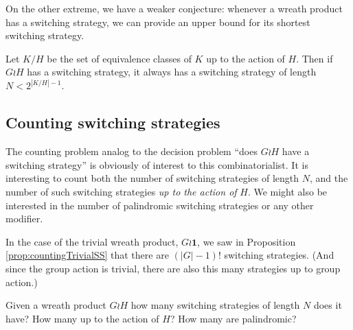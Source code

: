 On the other extreme, we have a weaker conjecture: whenever a wreath product has
a switching strategy, we can provide an upper bound for its shortest switching
strategy.

\begin{conjecture}
  Let $K/H$ be the set of equivalence classes of $K$ up to the action of $H$.
  Then if $G \wr H$ has a switching strategy, it always has a switching strategy
  of length $N < 2^{|K/H|-1}$.
\end{conjecture}

\subsection{Counting switching strategies}
The counting problem analog to the decision problem
``does $G \wr H$ have a switching strategy'' is obviously of interest to this
combinatorialist. It is interesting to count both the number of switching
strategies of length $N$, and the number of such switching strategies
\textit{up to the action of} $H$. We might also be interested in the number of
palindromic switching strategies or any other modifier.

In the case of the trivial wreath product, $G \wr \mathbf{1}$, we saw in
Proposition \ref{prop:countingTrivialSS} that there are $(|G| - 1)!$
switching strategies. (And since the group action is trivial, there are also
this many strategies up to group action.)

\begin{openquestion}
  Given a wreath product $G \wr H$ how many switching strategies of length $N$
  does it have? How many up to the action of $H$? How many are palindromic?
\end{openquestion}

